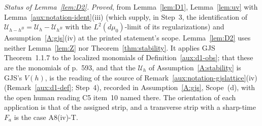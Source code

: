 \documentclass[11pt,a4paper]{article}
\theoremstyle{plain}
\theoremstyle{definition}
\theoremstyle{plain}
\theoremstyle{definition}
\newcommand{\Uc}{\mathcal U}
\newcommand{\dmu}{d\mu_0}
\begin{document}
\emph{Status of Lemma~\ref{lem:D2}.}  \emph{Proved}, from Lemma~\ref{lem:D1},
Lemma~\ref{lem:uv} with Lemma~\ref{aux:notation-ident}(iii) (which supply, in Step~3, the
identification of $\Uc_{h-h^B}=\Uc_h-\Uc_{h^B}$ with the $L^2(\dmu)$-limit of its
regularizations) and Assumption~\ref{A:gjs}(iv) at the printed statement's scope.
Lemma~\ref{lem:D2} uses neither Lemma~\ref{lem:Z} nor Theorem~\ref{thm:stability}.  It
applies GJS Theorem~1.1.7 to the localized monomials of Definition~\ref{aux:d1-obs}; that
these are the monomials of p.~593, and that the $\Uc_h$ of Assumption~\ref{A:stability} is
GJS's $V(h)$, is the reading of the source of Remark~\ref{aux:notation-gjslattice}(iv)
(Remark~\ref{aux:d1-def}; Step~4), recorded in Assumption~\ref{A:gjs}, Scope~(d), with the
open human reading C5 item~10 named there.  The orientation of each application is that of the
assigned strip, and a transverse strip with a sharp-time $F_a$ is the case A8(iv)-T.
\end{document}
